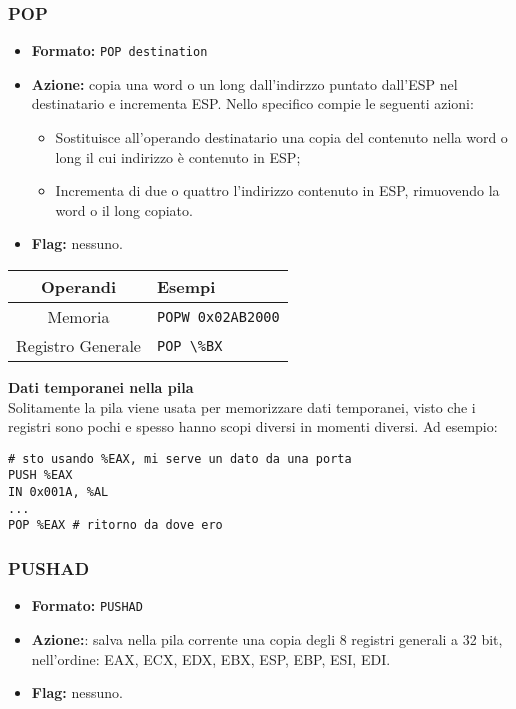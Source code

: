 \documentclass[a4paper,11pt]{article}
\begin{document}
\subsubsection{POP}
\begin{itemize}
	\item \textbf{Formato:} \lstinline|POP destination|
	\item \textbf{Azione:} copia una word o un long dall'indirzzo puntato dall'ESP nel destinatario e incrementa ESP.
		Nello specifico compie le seguenti azioni:
		\begin{itemize}
			\item Sostituisce all'operando destinatario una copia del contenuto nella word o long il cui indirizzo è contenuto in ESP;
			\item Incrementa di due o quattro l'indirizzo contenuto in ESP, rimuovendo la word o il long copiato.
		\end{itemize}
	\item \textbf{Flag:} nessuno.
\end{itemize}
	
		\begin{table}[h!]
			\center {}
			\begin{tabular} { c | p{5cm} }
				\bfseries Operandi & \bfseries Esempi \\
				\hline 
				Memoria & \lstinline|POPW 0x02AB2000| \\ 
				Registro Generale & \lstinline|POP \%BX|
			\end{tabular}
		\end{table}

\par\medskip

\noindent
\textsf{\textbf{Dati temporanei nella pila}} \\
Solitamente la pila viene usata per memorizzare dati temporanei, visto che i registri sono pochi e spesso hanno scopi diversi in momenti diversi. Ad esempio:

\begin{lstlisting}[language=assembler,style=codestyle]	
# sto usando %EAX, mi serve un dato da una porta
PUSH %EAX
IN 0x001A, %AL
...
POP %EAX # ritorno da dove ero
\end{lstlisting}

\subsubsection{PUSHAD}
\begin{itemize}
	\item \textbf{Formato:} \lstinline|PUSHAD|
	\item \textbf{Azione:}: salva nella pila corrente una copia degli 8 registri generali a 32 bit, nell'ordine: EAX, ECX, EDX, EBX, ESP, EBP, ESI, EDI.
	\item \textbf{Flag:} nessuno.
\end{itemize}
\end{document}
